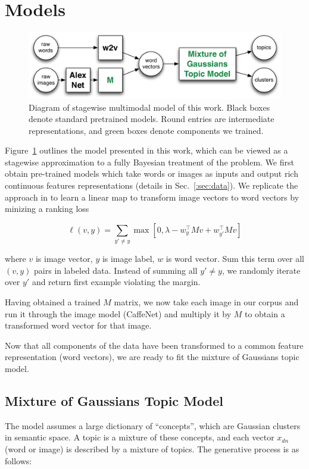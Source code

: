 \documentclass[11pt]{article}
\begin{document}
\section{Models}
\begin{figure}
\centering
\includegraphics[width=\columnwidth]{assets/stagewise_model.pdf}
\caption{\label{fig:stagewise} Diagram of stagewise multimodal model of this work. Black boxes denote standard pretrained models. Round entries are intermediate representations, and green boxes denote components we trained.}
\end{figure}

Figure~\ref{fig:stagewise} outlines the model presented in this work, which can be viewed as a stagewise approximation to a fully Bayesian treatment of the problem. We first obtain pre-trained models which take words or images as inputs and output rich continuous features representations (details in Sec.~\ref{:sec:data}). We replicate the approach in \cite{Frome13} to learn a linear map to transform image vectors to word vectors by minizing a ranking loss

$$\ell(v, y) = \sum_{y' \neq y} \max \left[0, \lambda - w_{y}^\top M v + w_{y'} ^\top M v \right]$$

where $v$ is image vector, $y$ is image label, $w$ is word vector. Sum this term over all $(v, y)$ pairs in labeled data. Instead of summing all $y' \neq y$, we randomly iterate over $y'$ and return first example violating the margin.

Having obtained a trained $M$ matrix, we now take each image in our corpus and run it through the image model (CaffeNet) and multiply it by $M$ to obtain a transformed word vector for that image.

Now that all components of the data have been transformed to a common feature representation (word vectors), we are ready to fit the mixture of Gaussians topic model.

\subsection{Mixture of Gaussians Topic Model}
The model assumes a large dictionary of ``concepts'', which are Gaussian clusters in semantic space. A topic is a mixture of these concepts, and each vector $x_{dn}$ (word or image) is described by a mixture of topics. The generative process is as follows:
\end{document}
